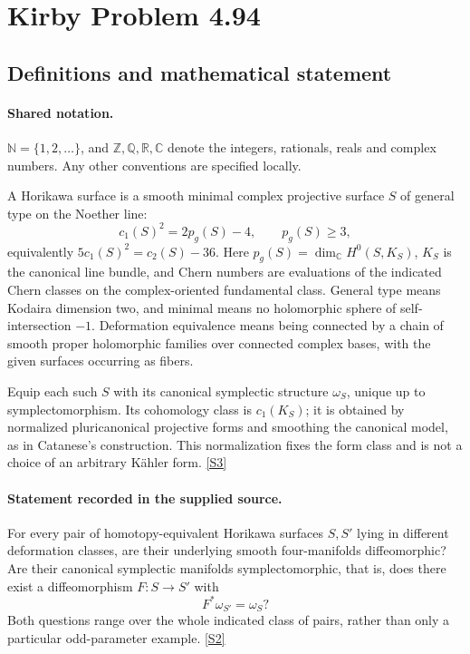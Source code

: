 \documentclass[11pt]{article}
\newcommand{\sref}[2]{\hyperlink{source:#1:#2}{[S#2]}}
\begin{document}
\section{Kirby Problem 4.94}\label{statement}

\subsection{Definitions and mathematical statement}

\paragraph{Shared notation.}$\mathbb N=\{1,2,\ldots\}$, and $\mathbb Z,\mathbb Q,\mathbb R,\mathbb C$ denote the integers, rationals, reals and complex numbers. Any other conventions are specified locally.


A Horikawa surface is a smooth minimal complex projective surface $S$ of general type on the Noether line:
\[
c_1(S)^2=2p_g(S)-4,\qquad p_g(S)\ge3,
\]
equivalently $5c_1(S)^2=c_2(S)-36$. Here $p_g(S)=\dim_{\mathbb C}H^0(S,K_S)$, $K_S$ is the canonical line bundle, and Chern numbers are evaluations of the indicated Chern classes on the complex-oriented fundamental class. General type means Kodaira dimension two, and minimal means no holomorphic sphere of self-intersection $-1$. Deformation equivalence means being connected by a chain of smooth proper holomorphic families over connected complex bases, with the given surfaces occurring as fibers.

Equip each such $S$ with its canonical symplectic structure $\omega_S$, unique up to symplectomorphism. Its cohomology class is $c_1(K_S)$; it is obtained by normalized pluricanonical projective forms and smoothing the canonical model, as in Catanese's construction. This normalization fixes the form class and is not a choice of an arbitrary Kähler form. \sref{statement}{3}
\paragraph{Statement recorded in the supplied source.}
For every pair of homotopy-equivalent Horikawa surfaces $S,S'$ lying in different deformation classes, are their underlying smooth four-manifolds diffeomorphic? Are their canonical symplectic manifolds symplectomorphic, that is, does there exist a diffeomorphism $F:S\to S'$ with
\[
F^*\omega_{S'}=\omega_S?
\]
Both questions range over the whole indicated class of pairs, rather than only a particular odd-parameter example. \sref{statement}{2}
\end{document}
